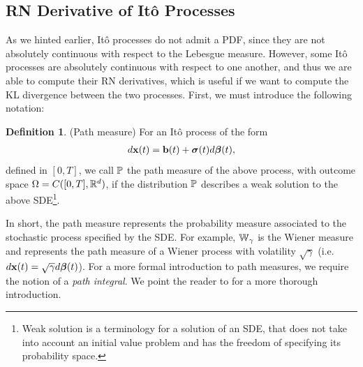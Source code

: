 \documentclass[a4paper,12pt,twoside,openright]{report}
\theoremstyle{definition}
\newtheorem{definition}{Definition}[section]
\begin{document}
\subsection{RN Derivative of Itô Processes}


As we hinted earlier, Itô processes do not admit a PDF, since they are not absolutely continuous with respect to the Lebesgue measure. However, some Itô processes are absolutely continuous with respect to one another, and thus we are able to compute their RN derivatives, which is useful if we want to compute the KL divergence between the two processes.  First, we must introduce the following notation:
\begin{definition} (Path measure) \label{def:pathmesu}
    For an Itô process of the form
    \begin{align*}
        d\rvx(t) = \rvb(t) + \rvsigma(t) d\rvw(t),
    \end{align*}
    defined in $[0,T]$, we call $\P$ the path measure of the above process, with outcome space $\Omega=C([0,T], \R^d)$, if the distribution $\P$ describes a weak solution to the above SDE\footnote{Weak solution is a terminology for a solution of an SDE, that does not take into account an initial value problem and has the freedom of specifying its probability space.}.
\end{definition}

In short, the path measure represents the probability measure associated to the stochastic process specified by the SDE.  For example, $\W_{\gamma}$ is the Wiener measure and represents the path measure of a Wiener process with volatility $\sqrt{\gamma}$
 (i.e. $d\rvx(t) = \sqrt{\gamma} d \rvw(t)$). For a more formal introduction to path measures, we require the notion of a \textit{path integral}. We point the reader to \cite{sarkka2019applied, oksendal2003stochastic} for a more thorough introduction.
 
\end{document}
